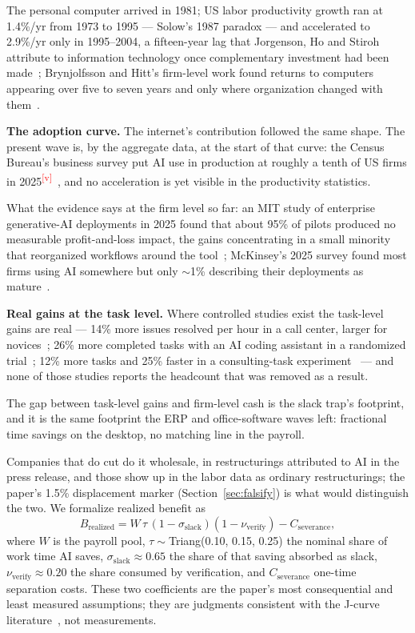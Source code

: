 \documentclass[11pt,letterpaper]{article}
\newcommand{\verify}{\textsuperscript{\textcolor{red}{[v]}}}
\newcommand{\lead}[1]{{\color{leadwarm}\sffamily\bfseries #1}}
\begin{document}
The personal computer arrived in 1981; US labor productivity growth ran at 1.4\%/yr from 1973 to 1995 --- Solow's 1987 paradox --- and accelerated to 2.9\%/yr only in 1995--2004, a fifteen-year lag that Jorgenson, Ho and Stiroh attribute to information technology once complementary investment had been made~\cite{ref:bls_productivity,ref:jorgenson2008}; Brynjolfsson and Hitt's firm-level work found returns to computers appearing over five to seven years and only where organization changed with them~\cite{ref:brynjolfsson_hitt2000}.

\lead{The adoption curve.} The internet's contribution followed the same shape. The present wave is, by the aggregate data, at the start of that curve: the Census Bureau's business survey put AI use in production at roughly a tenth of US firms in 2025\verify~\cite{ref:census_btos}, and no acceleration is yet visible in the productivity statistics.

What the evidence says at the firm level so far: an MIT study of enterprise generative-AI deployments in 2025 found that about 95\% of pilots produced no measurable profit-and-loss impact, the gains concentrating in a small minority that reorganized workflows around the tool~\cite{ref:mit_nanda}; McKinsey's 2025 survey found most firms using AI somewhere but only $\sim$1\% describing their deployments as mature~\cite{ref:mckinsey_ai2025}.

\lead{Real gains at the task level.} Where controlled studies exist the task-level gains are real --- 14\% more issues resolved per hour in a call center, larger for novices~\cite{ref:brynjolfsson_callcenter}; 26\% more completed tasks with an AI coding assistant in a randomized trial~\cite{ref:cui_copilot}; 12\% more tasks and 25\% faster in a consulting-task experiment~\cite{ref:dellacqua_bcg} --- and none of those studies reports the headcount that was removed as a result.

The gap between task-level gains and firm-level cash is the slack trap's footprint, and it is the same footprint the ERP and office-software waves left: fractional time savings on the desktop, no matching line in the payroll.

Companies that do cut do it wholesale, in restructurings attributed to AI in the press release, and those show up in the labor data as ordinary restructurings; the paper's 1.5\% displacement marker (Section~\ref{sec:falsify}) is what would distinguish the two. We formalize realized benefit as
\begin{equation}
B_{\text{realized}}=W\,\tau\,(1-\sigma_{\text{slack}})(1-\nu_{\text{verify}})-C_{\text{severance}},
\end{equation}
where $W$ is the payroll pool, $\tau\sim$Triang(0.10, 0.15, 0.25) the nominal share of work time AI saves, $\sigma_{\text{slack}}\approx0.65$ the share of that saving absorbed as slack, $\nu_{\text{verify}}\approx0.20$ the share consumed by verification, and $C_{\text{severance}}$ one-time separation costs. These two coefficients are the paper's most consequential and least measured assumptions; they are judgments consistent with the J-curve literature~\cite{ref:brynjolfsson2021}, not measurements.
\end{document}
